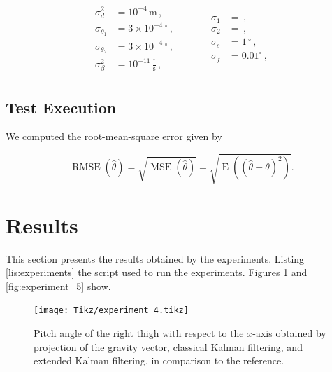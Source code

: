 \begin{equation}
\begin{matrix}
	\begin{split}
	  \sigma^2_d &= 10^{-4}\,\mbox{m}\,, \\
	  \sigma_{\theta_1} &= 3 \times 10^{-4}\,^{\circ} \,, \\
	  \sigma_{\theta_2} &= 3 \times 10^{-4}\,^{\circ} \,, \\
	  \sigma^2_{\beta} &= 10^{-11} \, \frac{^{\circ}}{\mbox{s}} \,,
\end{split} \qquad \quad
    \begin{split}
	  \sigma_1 &= \,, \\
	  \sigma_2 &= \,, \\
	  \sigma_s &= 1\,^{\circ} \,, \\
	  \sigma_f &= 0.01^{\circ} \,,  
\end{split}
\end{matrix}
\end{equation}

\subsection{Test Execution}

 We computed the root-mean-square error given by

\begin{equation}
  \operatorname{RMSE}(\hat{\theta}) = \sqrt{\operatorname{MSE}(\hat{\theta})} = \sqrt{\operatorname{E}((\hat{\theta}-\theta)^2)}.
\end{equation}


\section{Results}

This section presents the results obtained by the experiments. Listing \ref{lis:experiments} the script used to run the experiments. Figures \ref{fig:experiment_4} and \ref{fig:experiment_5} show.

\begin{figure}
	\centering
	\setlength\figureheight{7cm} 
	\setlength\figurewidth{\textwidth}
	\texttt{[image: Tikz/experiment\_4.tikz]}
	\caption{Pitch angle of the right thigh with respect to the $x$-axis obtained by projection of the gravity vector, classical Kalman filtering, and extended Kalman filtering, in comparison to the reference.}
	\label{fig:experiment_4}
\end{figure}

